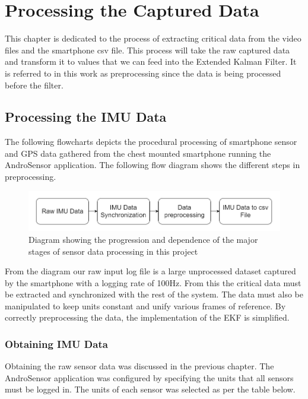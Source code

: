 \chapter{Processing the Captured Data}
This chapter is dedicated to the process of extracting critical data from the video files and the smartphone csv file. This process will take the raw captured data and transform it to values that we can feed into the Extended Kalman Filter. It is referred to in this work as preprocessing since the data is being processed before the filter.

\section{Processing the IMU Data}
The following flowcharts depicts the procedural processing of smartphone sensor and GPS data gathered from the chest mounted smartphone running the AndroSensor application. The following flow diagram shows the different steps in preprocessing.

\begin{figure}[!ht]
\captionsetup{width=0.8\linewidth, font=small}  
\includegraphics[width=\linewidth]{figures/imuflow.png}
\caption{Diagram showing the progression and dependence of the major stages of sensor data processing in this project}
\label{fig:imuflow}
\end{figure}

From the diagram our raw input log file is a large unprocessed dataset captured by the smartphone with a logging rate of 100Hz. From this the critical data must be extracted and synchronized with the rest of the system. The data must also be manipulated to keep units constant and unify various frames of reference. By correctly preprocessing the data, the implementation of the EKF is simplified.

\subsection{Obtaining IMU Data}
Obtaining the raw sensor data was discussed in the previous chapter. The AndroSensor application was configured by specifying the units that all sensors must be logged in. The units of each sensor was selected as per the table below.

